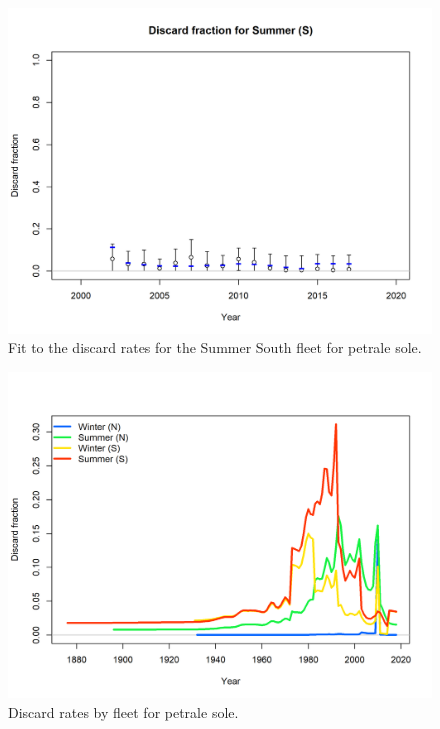 \documentclass[12pt,]{article}
\begin{document}
\FloatBarrier

\begin{figure}
\centering
\includegraphics{r4ss/plots_mod1/discard_dataSummer (S).png}
\caption{Fit to the discard rates for the Summer South fleet for petrale
sole. \label{fig:fit_ss_discard}}
\end{figure}

\FloatBarrier

\begin{figure}
\centering
\includegraphics{r4ss/plots_mod1/catch8 discard fraction.png}
\caption{Discard rates by fleet for petrale sole. \label{fig:Discard}}
\end{figure}
\end{document}
